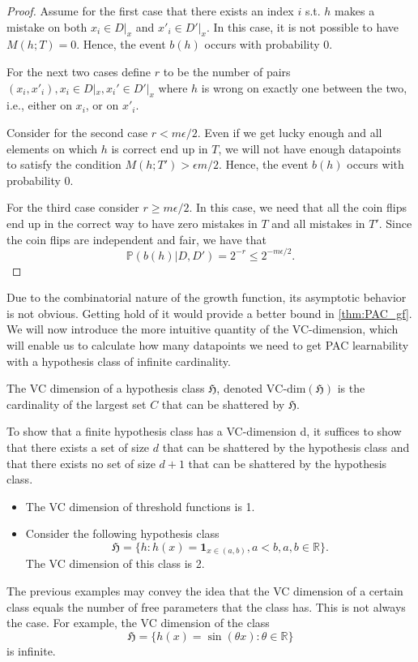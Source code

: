 \begin{proof}
Assume for the first case that there exists an index $i$ s.t. $h$ makes a mistake
on both $x_i \in D|_x$ and $x'_i \in D'|_x$. In this case, it is not possible to have $M(h;T)=0$.
Hence, the event $b(h)$ occurs with probability 0.

For the next two cases define $r$ to be the number of pairs $(x_i, x'_i), x_i
\in D|_x, x_i' \in D'|_x$ where $h$ is wrong on exactly one between the two,
i.e., either on $x_i$, or on $x'_i$.

Consider for the second case $r < m \epsilon/2$. Even if we get lucky enough and
all elements on which $h$ is correct end up in $T$, we will not have enough
datapoints to satisfy the condition $M(h;T') > \epsilon m/2$. Hence, the event $b(h)$ occurs with probability 0.

For the third case consider $r \geq m \epsilon/2$. In this case, we need that
all the coin flips end up in the correct way to have zero mistakes in $T$ and
all mistakes in $T'$. Since the coin flips are independent and fair, we have
that
$$
\mathbb{P}(b(h)|D, D') = 2^{-r} \leq 2^{-m \epsilon/2}.
$$

\end{proof}
	Due to the combinatorial nature of the growth function, its asymptotic
behavior is not obvious. Getting hold of it would provide a better bound in
\autoref{thm:PAC_gf}. We will now introduce the more intuitive quantity of the
VC-dimension, which will enable us to calculate how many datapoints we need to get
PAC learnability with a hypothesis class of infinite cardinality.	
	\begin{definition}
		The VC dimension of a hypothesis class $\mathfrak{H}$, denoted
		$\text{VC-dim}(\mathfrak{H})$ is the cardinality of the largest set $C$ that
		can be shattered by $\mathfrak{H}$.  
	\end{definition}
	\begin{example}
		To show that a finite hypothesis class has a VC-dimension d, it suffices to show that there exists a set of size $d$ that can be shattered by the hypothesis class and that there exists no set of size $d+1$ that can be shattered by the hypothesis class.
		\begin{itemize}
			\item The VC dimension of threshold functions is 1.
			\item Consider the following hypothesis class
			$$
			\mathfrak{H} = \{h: h(x) = \mathbf{1}_{x \in (a,b)}, a<b, a,b\in \mathbb{R}\}.
			$$ 
			The VC dimension of this class is 2.
		\end{itemize}
	\end{example}
	The previous examples may convey the idea that the VC dimension of a certain
	class equals the number of free parameters that the class has. This is not
	always the case. For example, the VC dimension of the class 
	$$
	\mathfrak{H} = \{h(x) = \sin(\theta x): \theta \in \mathbb{R}\}
	$$
	is infinite.

